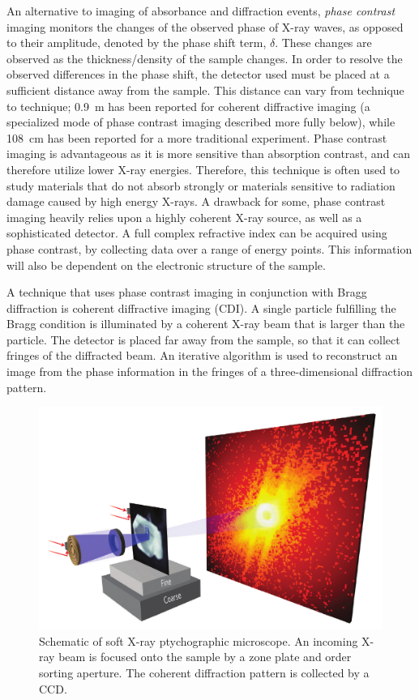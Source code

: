 \documentclass[journal=cmatex,manuscript=perspective]{achemso}
\begin{document}
An alternative to imaging of absorbance and diffraction events, \emph{phase contrast}
imaging monitors the changes of the observed phase of X-ray waves, as
opposed to their amplitude, denoted by the phase shift term,
$\delta$. These changes are observed as the thickness/density of the
sample changes. In order to resolve the observed differences in the
phase shift, the detector used must be placed at a sufficient distance
away from the sample. This distance can vary from technique to
technique; \SI{0.9}{m} has been reported for coherent diffractive
imaging (a specialized mode of phase contrast imaging described more
fully below)\cite{shpyrko2014}, while \SI{108}{cm} has been reported
for a more traditional experiment\cite{wen2014}. Phase contrast
imaging is advantageous as it is more sensitive than absorption
contrast, and can therefore utilize lower X-ray energies. Therefore,
this technique is often used to study materials that do not absorb
strongly or materials sensitive to radiation damage caused by high
energy X-rays. A drawback for some, phase contrast imaging heavily
relies upon a highly coherent X-ray source, as well as a sophisticated
detector. A full complex refractive index can be acquired using phase
contrast, by collecting data over a range of energy points. This
information will also be dependent on the electronic structure of the
sample.

A technique that uses phase contrast imaging in conjunction with Bragg
diffraction is coherent diffractive imaging (CDI). A single particle
fulfilling the Bragg condition is illuminated by a coherent X-ray beam
that is larger than the particle. The detector is placed far away from
the sample, so that it can collect fringes of the diffracted beam. An
iterative algorithm is used to reconstruct an image from the phase
information in the fringes of a three-dimensional diffraction
pattern\cite{robinson2009}.

\begin{figure}
  \includegraphics[width=\textwidth]{shapiro2014.png}
  \caption{Schematic of soft X-ray ptychographic microscope. An
    incoming X-ray beam is focused onto the sample by a zone plate and
    order sorting aperture. The coherent diffraction pattern is
    collected by a CCD\cite{shapiro2014}.}
  \label{figure:shapiro2014}
\end{figure}
\end{document}
